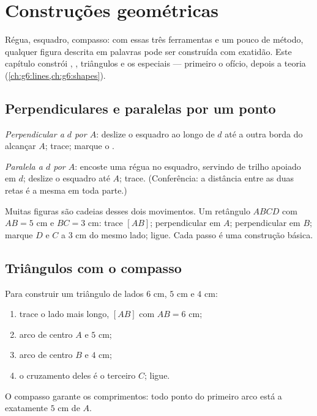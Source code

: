 \chapter{Construções geométricas}\label{ch:g5:geometry}

Régua, esquadro, compasso: com essas três ferramentas e um pouco de
método, qualquer figura descrita em palavras pode ser construída com
exatidão. Este capítulo constrói , ,
triângulos e os  especiais --- primeiro o ofício, depois
a teoria (\cref{ch:g6:lines,ch:g6:shapes}).

\section{Perpendiculares e paralelas por um ponto}

\begin{method}\label{met:g5:geometry:basic}
\emph{Perpendicular a $d$ por $A$}: deslize o esquadro ao longo de
$d$ até a outra borda do  alcançar $A$; trace; marque o
.

\emph{Paralela a $d$ por $A$}: encoste uma régua no esquadro, servindo
de trilho apoiado em $d$; deslize o esquadro até $A$; trace.
(Conferência: a distância entre as duas retas é a mesma em toda
parte.)
\end{method}

\begin{example}\label{ex:g5:geometry:chain}
Muitas figuras são cadeias desses dois movimentos. Um retângulo
$ABCD$ com $AB = 5$ cm e $BC = 3$ cm: trace $[AB]$; perpendicular em
$A$; perpendicular em $B$; marque $D$ e $C$ a $3$ cm do mesmo lado;
ligue. Cada passo é uma construção básica.
\end{example}

\section{Triângulos com o compasso}

\begin{method}\label{met:g5:geometry:triangle}
Para construir um triângulo de lados $6$ cm, $5$ cm e $4$ cm:
\begin{enumerate}
  \item trace o lado mais longo, $[AB]$ com $AB = 6$ cm;
  \item arco de centro $A$ e  $5$ cm;
  \item arco de centro $B$ e  $4$ cm;
  \item o cruzamento deles é o terceiro  $C$; ligue.
\end{enumerate}
O compasso garante os comprimentos: todo ponto do primeiro arco está
a exatamente $5$ cm de $A$.
\end{method}


